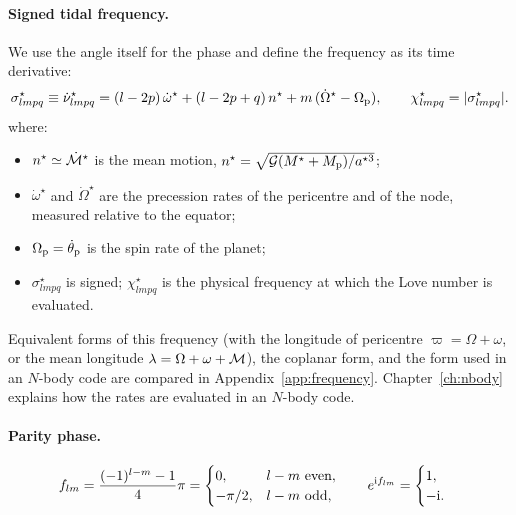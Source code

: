 \paragraph{Signed tidal frequency.} We use the angle itself for the phase and define the frequency as its time derivative:
\begin{equation}
  \sigma^\star_{lmpq}\equiv\dot\nu^\star_{lmpq}=(l-2p)\,\dot\omega^\star+(l-2p+q)\,n^\star+m\,(\dot\Omega^\star-\Omega_{\mathrm p}),\qquad \chi^\star_{lmpq}=|\sigma^\star_{lmpq}|. \label{eq:sigma}
\end{equation}
where:
\begin{itemize}
  \item $n^\star\simeq\dot{\mathcal{M}}^\star$ is the mean motion, $n^\star=\sqrt{\mathcal{G}(M^\star+M_{\mathrm p})/a^{\star3}}$;
  \item $\dot\omega^\star$ and $\dot\Omega^\star$ are the precession rates of the pericentre and of the node, measured relative to the equator;
  \item $\Omega_{\mathrm p}=\dot\theta_{\mathrm p}$ is the spin rate of the planet;
  \item $\sigma^\star_{lmpq}$ is signed; $\chi^\star_{lmpq}$ is the physical frequency at which the Love number is evaluated.
\end{itemize}
Equivalent forms of this frequency (with the longitude of pericentre $\varpi=\Omega+\omega$, or the mean longitude $\lambda=\Omega+\omega+\mathcal{M}$), the coplanar form, and the form used in an $N$-body code are compared in Appendix~\ref{app:frequency}. Chapter~\ref{ch:nbody} explains how the rates are evaluated in an $N$-body code.

\paragraph{Parity phase.}
\begin{equation}
  f_{lm}=\frac{(-1)^{l-m}-1}{4}\pi=\begin{cases}0,& l-m\ \text{even},\\-\pi/2,& l-m\ \text{odd},\end{cases}\qquad e^{\mathrm{i} f_{lm}}=\begin{cases}1,\\-\mathrm{i}.\end{cases} \label{eq:flm}
\end{equation}

